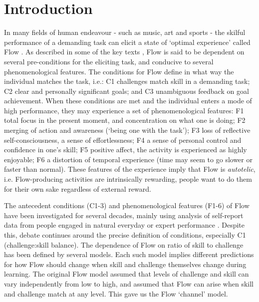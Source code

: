 \documentclass{frontierstyle/frontiersSCNS}
\newcommand{\hl}{\textcolor{red!80}}
\begin{document}
\section{Introduction}

In many fields of human endeavour - such as music, art and sports - the skilful performance of a demanding task can elicit a state of `optimal experience' called Flow \citep{Csikszentmihalyi1975}. \hl{As described in some of the key texts \citep{Nakamura2002,Engeser2012intro,Keller2012}, Flow is said to be dependent on several pre-conditions for the eliciting task, and conducive to several phenomenological features. The conditions for Flow define in what way the individual matches the task}, i.e.: {\sf C1} challenges match skill in a demanding task; {\sf C2} clear and personally significant goals; and {\sf C3} unambiguous feedback on goal achievement. When these conditions are met and the individual enters a mode of high performance, they may experience a set of phenomenological features: {\sf F1} total focus in the present moment, and concentration on what one is doing; {\sf F2} merging of action and awareness (`being one with the task'); {\sf F3} loss of reflective self-consciousness, a sense of effortlessness; {\sf F4} a sense of personal control and confidence in one's skill; {\sf F5} positive affect, the activity is experienced as highly enjoyable; {\sf F6} a distortion of temporal experience (time may seem to go slower or faster than normal). These features of the experience imply that Flow is {\it autotelic}, i.e. Flow-producing activities are intrinsically rewarding, people want to do them for their own sake regardless of external reward.

The antecedent conditions ({\sf C1-3}) and phenomenological features ({\sf F1-6}) of Flow have been investigated for several decades, mainly using analysis of self-report data from people engaged in natural everyday or expert performance \citep{Csikszentmihalyi1971,Moneta2012}. Despite this, debate continues around the precise definition of conditions, especially {\sf C1} (challenge:skill balance). \hl{The dependence of Flow on ratio of skill to challenge has been defined by several models. Each such model implies different predictions for how Flow should change when skill and challenge themselves change during learning. The original Flow model \citep{Csikszentmihalyi1975} assumed that levels of challenge and skill can vary independently from low to high, and assumed that Flow can arise when skill and challenge match at any level. This gave us the Flow `channel' model.}
\end{document}
